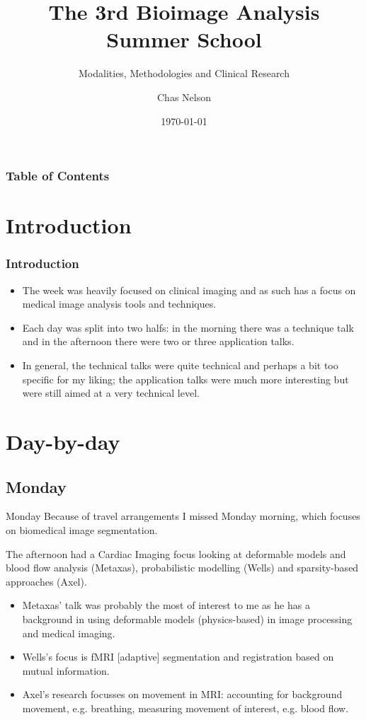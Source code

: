 \documentclass[11pt]{beamer}
\title{The 3rd Bioimage Analysis Summer School}
\subtitle{Modalities, Methodologies and Clinical Research}
\date{\today}
\author{Chas Nelson}
\institute{School of Engineering and Computing Sciences, Durham University}
\begin{document}

\maketitle

\begin{frame}
  \frametitle{Table of Contents}
  \tableofcontents[hideallsubsections]
\end{frame}

\section{Introduction}
\begin{frame}
  \frametitle{Introduction}
  \begin{itemize}
  \item The week was heavily focused on clinical imaging and as such has a focus on medical image analysis tools and techniques.
  \item Each day was split into two halfs: in the morning there was a technique talk and in the afternoon there were two or three application talks.
  \item In general, the technical talks were quite technical and perhaps a bit too specific for my liking; the application talks were much more interesting but were still aimed at a very technical level.
    \end{itemize}
\end{frame}

\section{Day-by-day}
\subsection{Monday}
\begin{frame}{Monday}
  Because of travel arrangements I missed Monday morning, which focuses on biomedical image segmentation.
  
  The afternoon had a Cardiac Imaging focus looking at deformable models and blood flow analysis (Metaxas), probabilistic modelling (Wells) and sparsity-based approaches (Axel).
\end{frame}
\begin{frame} 
  \begin{itemize}
  \item Metaxas' talk was probably the most of interest to me as he has a background in using deformable models (physics-based) in image processing and medical imaging.
  \item Wells's focus is fMRI [adaptive] segmentation and registration based on mutual information. 
  \item Axel's research focusses on movement in MRI: accounting for background movement, e.g. breathing, measuring movement of interest, e.g. blood flow.
  \end{itemize}
\end{frame}
\end{document}
